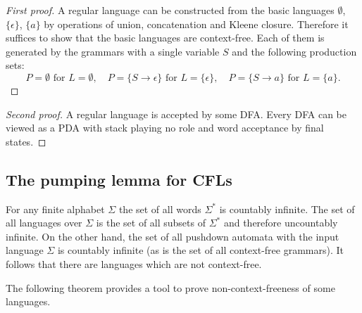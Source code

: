 \begin{page}
\setcounter{section}{7}
\setcounter{subsection}{2}
\setcounter{dfn}{2}
\label{portion:1153}

\begin{proof}[First proof]
A regular language can be constructed from the basic languages $\emptyset$, $\{\epsilon\}$, $\{a\}$
by operations of union, concatenation and Kleene closure.
Therefore it suffices to show that the basic languages are context-free.
Each of them is generated by the grammars with a single variable $S$ and the following production sets:
\[
P = \emptyset \text{ for }L = \emptyset, \quad P = \{S \to \epsilon\} \text{ for }L = \{\epsilon\}, \quad P = \{S \to a\} \text{ for }L = \{a\}.
\]
\end{proof}

\begin{proof}[Second proof]
A regular language is accepted by some DFA. 
Every DFA can be viewed as a PDA with stack playing no role and word acceptance by final states.
\end{proof}



\end{page}

\begin{page}
\setcounter{section}{7}
\setcounter{subsection}{2}
\setcounter{dfn}{2}
\label{portion:1154}

\subsection{The pumping lemma for CFLs}
For any finite alphabet $\Sigma$ the set of all words $\Sigma^*$ is countably infinite.
The set of all languages over $\Sigma$ is the set of all subsets of $\Sigma^*$ and therefore uncountably infinite.
On the other hand, the set of all pushdown automata with the input language $\Sigma$ is countably infinite
(as is the set of all context-free grammars).
It follows that there are languages which are not context-free.

The following theorem provides a tool to prove non-context-freeness of some languages.


\end{page}


